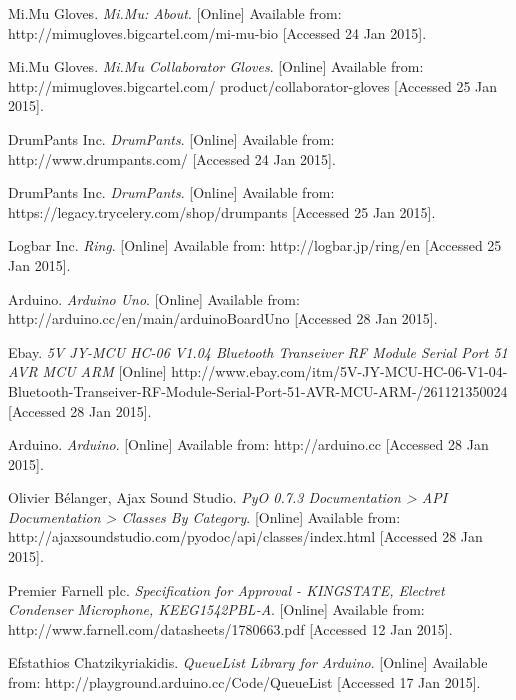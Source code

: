 \begin{thebibliography}{99}

    Mi.Mu Gloves. \emph{Mi.Mu: About}. [Online] Available from: http://mimugloves.bigcartel.com/mi-mu-bio [Accessed 24 Jan 2015].
    
    Mi.Mu Gloves. \emph{Mi.Mu Collaborator Gloves}. [Online] Available from:  http://mimugloves.bigcartel.com/
    product/collaborator-gloves [Accessed 25 Jan 2015].
    
    DrumPants Inc. \emph{DrumPants}. [Online] Available from: http://www.drumpants.com/ [Accessed 24 Jan 2015].

    DrumPants Inc. \emph{DrumPants}. [Online] Available from: https://legacy.trycelery.com/shop/drumpants [Accessed 25 Jan 2015].

    Logbar Inc. \emph{Ring}. [Online] Available from: http://logbar.jp/ring/en [Accessed 25 Jan 2015].
    

    Arduino. \emph{Arduino Uno}. [Online] Available from: http://arduino.cc/en/main/arduinoBoardUno [Accessed 28 Jan 2015].
    
    Ebay. \emph{5V JY-MCU HC-06 V1.04 Bluetooth Transeiver RF Module Serial Port 51 AVR MCU ARM} [Online] http://www.ebay.com/itm/5V-JY-MCU-HC-06-V1-04-Bluetooth-Transeiver-RF-Module-Serial-Port-51-AVR-MCU-ARM-/261121350024 [Accessed 28 Jan 2015].
    
    Arduino. \emph{Arduino}. [Online] Available from: http://arduino.cc [Accessed 28 Jan 2015].

    Olivier B\'{e}langer, Ajax Sound Studio. \emph{PyO 0.7.3 Documentation > API Documentation > Classes By Category}. [Online] Available from: http://ajaxsoundstudio.com/pyodoc/api/classes/index.html [Accessed 28 Jan 2015].


    Premier Farnell plc. \emph{Specification for Approval - KINGSTATE, Electret Condenser Microphone, KEEG1542PBL-A}. [Online] Available from: http://www.farnell.com/datasheets/1780663.pdf [Accessed 12 Jan 2015].



    Efstathios Chatzikyriakidis. \emph{QueueList Library for Arduino}. [Online] Available from: http://playground.arduino.cc/Code/QueueList [Accessed 17 Jan 2015].



\end{thebibliography}
